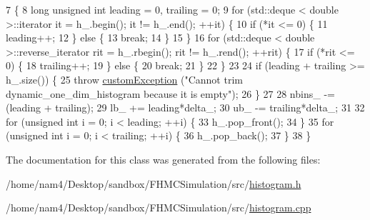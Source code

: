 \begin{DoxyCode}
7                                             \{
8     \textcolor{keywordtype}{long} \textcolor{keywordtype}{unsigned} \textcolor{keywordtype}{int} leading = 0, trailing = 0;
9     \textcolor{keywordflow}{for} (std::deque < double >::iterator it = h\_.begin(); it != h\_.end(); ++it) \{
10         \textcolor{keywordflow}{if} (*it <= 0) \{
11             leading++;
12         \} \textcolor{keywordflow}{else} \{
13             \textcolor{keywordflow}{break};
14         \}
15     \}
16     \textcolor{keywordflow}{for} (std::deque < double >::reverse\_iterator rit = h\_.rbegin(); rit != h\_.rend(); ++rit) \{
17         \textcolor{keywordflow}{if} (*rit <= 0) \{
18             trailing++;
19         \} \textcolor{keywordflow}{else} \{
20             \textcolor{keywordflow}{break};
21         \}
22     \}
23 
24     \textcolor{keywordflow}{if} (leading + trailing >= h\_.size()) \{
25         \textcolor{keywordflow}{throw} \hyperlink{classcustom_exception}{customException} (\textcolor{stringliteral}{"Cannot trim dynamic\_one\_dim\_histogram because it is empty"});
26     \}
27 
28     nbins\_ -= (leading + trailing);
29     lb\_ += leading*delta\_;
30     ub\_ -= trailing*delta\_;
31 
32     \textcolor{keywordflow}{for} (\textcolor{keywordtype}{unsigned} \textcolor{keywordtype}{int} i = 0; i < leading; ++i) \{
33         h\_.pop\_front();
34     \}
35     \textcolor{keywordflow}{for} (\textcolor{keywordtype}{unsigned} \textcolor{keywordtype}{int} i = 0; i < trailing; ++i) \{
36         h\_.pop\_back();
37     \}
38 \}
\end{DoxyCode}


The documentation for this class was generated from the following files\-:\begin{DoxyCompactItemize}
\item 
/home/nam4/\-Desktop/sandbox/\-F\-H\-M\-C\-Simulation/src/\hyperlink{histogram_8h}{histogram.\-h}\item 
/home/nam4/\-Desktop/sandbox/\-F\-H\-M\-C\-Simulation/src/\hyperlink{histogram_8cpp}{histogram.\-cpp}\end{DoxyCompactItemize}
